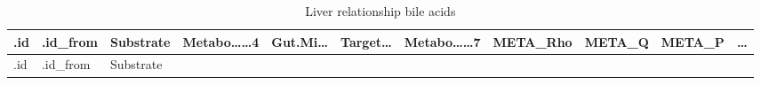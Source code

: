 \documentclass[
]{article}
\begin{document}
\begin{longtable}[]{@{}lllllllllll@{}}
\caption{\label{tab:Liver-relationship-bile-acids}Liver relationship bile acids}\tabularnewline
\toprule
\begin{minipage}[b]{0.03\columnwidth}\raggedright
.id\strut
\end{minipage} & \begin{minipage}[b]{0.07\columnwidth}\raggedright
.id\_from\strut
\end{minipage} & \begin{minipage}[b]{0.07\columnwidth}\raggedright
Substrate\strut
\end{minipage} & \begin{minipage}[b]{0.09\columnwidth}\raggedright
Metabo\ldots\ldots4\strut
\end{minipage} & \begin{minipage}[b]{0.07\columnwidth}\raggedright
Gut.Mi\ldots{}\strut
\end{minipage} & \begin{minipage}[b]{0.07\columnwidth}\raggedright
Target\ldots{}\strut
\end{minipage} & \begin{minipage}[b]{0.09\columnwidth}\raggedright
Metabo\ldots\ldots7\strut
\end{minipage} & \begin{minipage}[b]{0.07\columnwidth}\raggedright
META\_Rho\strut
\end{minipage} & \begin{minipage}[b]{0.07\columnwidth}\raggedright
META\_Q\strut
\end{minipage} & \begin{minipage}[b]{0.07\columnwidth}\raggedright
META\_P\strut
\end{minipage} & \begin{minipage}[b]{0.03\columnwidth}\raggedright
\ldots{}\strut
\end{minipage}\tabularnewline
\midrule
\endfirsthead
\toprule
\begin{minipage}[b]{0.03\columnwidth}\raggedright
.id\strut
\end{minipage} & \begin{minipage}[b]{0.07\columnwidth}\raggedright
.id\_from\strut
\end{minipage} & \begin{minipage}[b]{0.07\columnwidth}\raggedright
Substrate\strut
\end{minipage} & \begin{minipage}[b]{0.09\columnwidth}\raggedright

\end{minipage}
\end{longtable}
\end{document}
